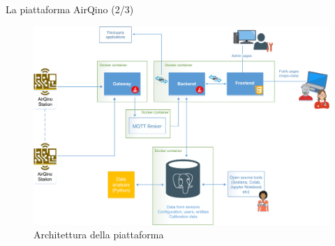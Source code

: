 \begin{frame}[t]{La piattaforma AirQino (2/3)}
\begin{center}

\begin{figure}[H]
\centering
\captionsetup{justification=centering}
\includegraphics[width=.8\textwidth]{images/airqino_arch.png}
\caption{Architettura della piattaforma}
\end{figure}

\end{center}
\end{frame}

